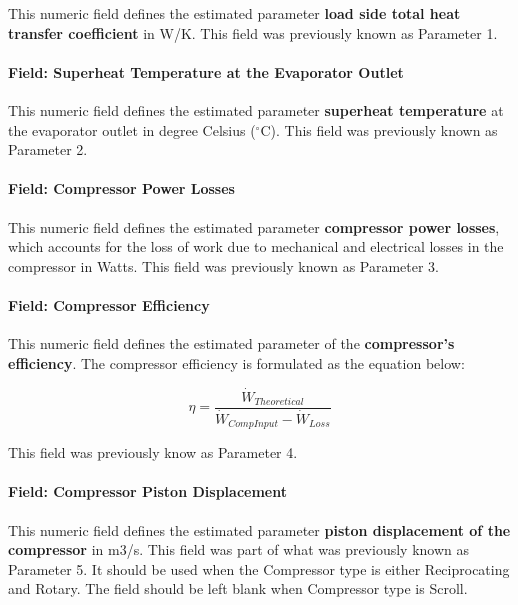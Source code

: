 This numeric field defines the estimated parameter \textbf{load side total heat transfer coefficient} in W/K. This field was previously known as Parameter 1.

\paragraph{Field: Superheat Temperature at the Evaporator Outlet}\label{field-superheat-temperature-at-the-evaporator-outlet-1}

This numeric field defines the estimated parameter \textbf{superheat temperature} at the evaporator outlet in degree Celsius ($^\circ$C). This field was previously known as Parameter 2.

\paragraph{Field: Compressor Power Losses}\label{field-compressor-power-losses-1}

This numeric field defines the estimated parameter \textbf{compressor power losses}, which accounts for the loss of work due to mechanical and electrical losses in the compressor in Watts. This field was previously known as Parameter 3.

\paragraph{Field: Compressor Efficiency}\label{field-compressor-efficiency-1}

This numeric field defines the estimated parameter of the \textbf{compressor's efficiency}. The compressor efficiency is formulated as the equation below:

\begin{equation}
\eta  = \frac{{{{\dot W}_{Theoretical}}}}{{{{\dot W}_{CompInput}} - {{\dot W}_{Loss}}}}
\end{equation}

This field was previously know as Parameter 4.

\paragraph{Field: Compressor Piston Displacement}\label{field-compressor-piston-displacement-1}

This numeric field defines the estimated parameter \textbf{piston displacement of the compressor} in m3/s. This field was part of what was previously known as Parameter 5. It should be used when the Compressor type is either Reciprocating and Rotary. The field should be left blank when Compressor type is Scroll.

